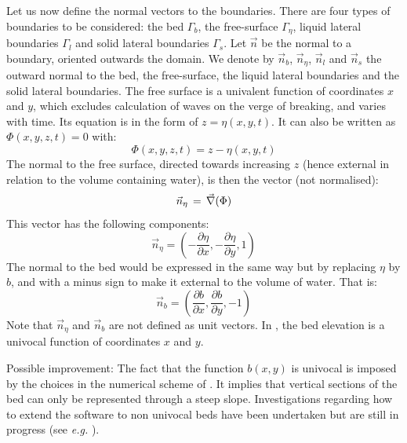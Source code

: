 Let us now define the normal vectors to the boundaries.
There are four types of boundaries to be considered: the bed $\Gamma_b$,
the free-surface $\Gamma_\eta$, liquid lateral boundaries $\Gamma_l$ and solid
lateral boundaries $\Gamma_s$. Let $\vec{n}$ be the normal to a boundary, oriented outwards the domain.
We denote by $\vec{n}_b$, $\vec{n}_\eta$, $\vec{n}_l$ and $\vec{n}_s$ the outward normal to the bed,
the free-surface, the liquid lateral boundaries and the solid lateral boundaries.
The free surface is a univalent function of coordinates $x$ and $y$, which
excludes calculation of waves on the verge of breaking, and varies with time.
Its equation is in the form of $z=\eta(x,y,t)$. It can also be written as
$\Phi(x,y,z,t)=0$ with:%
\begin{equation}
  \Phi(x,y,z,t)=z-\eta(x,y,t)
\end{equation}
The normal to the free surface, directed towards increasing $z$ (hence
external in relation to the volume containing water), is then the vector (not normalised):%
\begin{equation}
\vec{n}_{\eta}\,=\,\vec \nabla(\Phi)
\end{equation}
This vector has the following components:
\begin{equation}
  \vec{n}_{\eta} =\left(  -\dfrac{\partial \eta}{\partial x},-\dfrac{\partial \eta%
    }{\partial y},1\right)
\end{equation}
The normal to the bed would be expressed in the same way but by replacing
$\eta$ by $b$, and with a minus sign to make it external to the volume of
water. That is:%
\begin{equation}
  \vec{n}_{b}=\left(  \dfrac{\partial b}{\partial x},\dfrac{\partial b%
    }{\partial y},-1\right)
\end{equation}
Note that $\vec{n}_{\eta}$ and $\vec{n}_{b}$ are not defined as unit vectors.
In , the bed elevation is a univocal function of coordinates $x$ and $y$. 

\begin{CommentBlock}{Possible improvement:}
  The fact that the function $b(x,y)$ is univocal is imposed by the choices in the numerical
  scheme of . It implies that vertical sections of the bed can only be
  represented through a steep slope. Investigations regarding how to extend the 
  software to non univocal beds have been undertaken but are still in progress
  (see \textit{e.g.} \cite{Wang2016}).
\end{CommentBlock}

